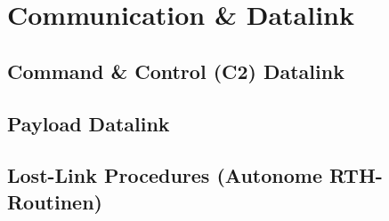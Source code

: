 ﻿\chapter{Communication \& Datalink}
\label{ch:communication}
\section{Command \& Control (C2) Datalink}
\section{Payload Datalink}
\section{Lost-Link Procedures (Autonome RTH-Routinen)}
